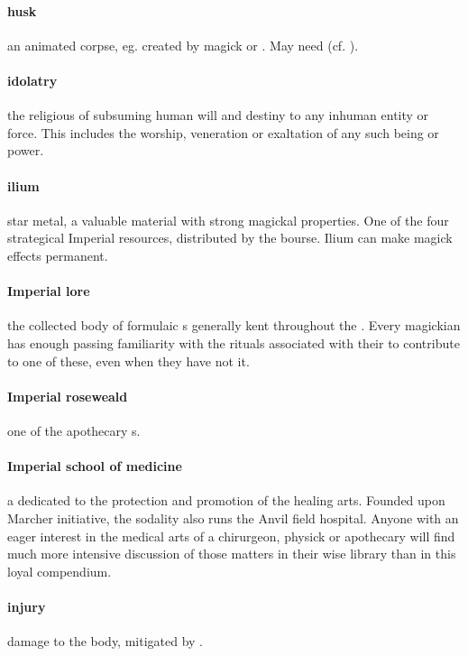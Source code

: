 \paragraph{husk} an animated corpse, eg. created by  magick or . May need  (cf. ).
\paragraph{idolatry}the religious  of subsuming human will and destiny to any inhuman entity or force. This includes the worship, veneration or exaltation of any such being or power.
\paragraph{ilium} star metal, a valuable material with strong magickal properties. One of the four strategical Imperial resources, distributed by the bourse. Ilium can make magick effects permanent.
\paragraph{Imperial lore} the collected body of formulaic s generally kent throughout the . Every magickian has enough passing familiarity with the rituals associated with their  to contribute to one of these, even when they have not  it.
\paragraph{Imperial roseweald} one of the apothecary s.
\paragraph{Imperial school of medicine} a  dedicated to the protection and promotion of the healing arts. Founded upon Marcher initiative, the sodality also runs the Anvil field hospital. Anyone with an eager interest in the medical arts of a chirurgeon, physick or apothecary will find much more intensive discussion of those matters in their wise library than in this loyal compendium.
\paragraph{injury} damage to the body, mitigated by .
